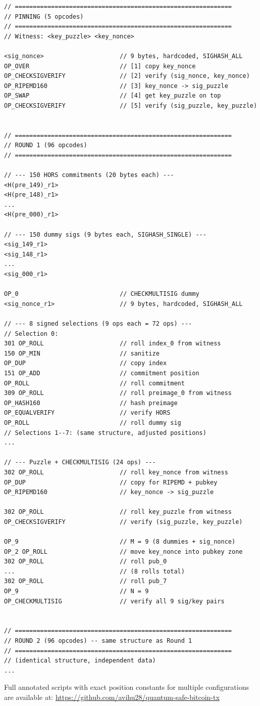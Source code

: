 \documentclass[11pt, a4paper]{article}
\begin{document}
\begin{lstlisting}[language={}, numbers=none, basicstyle=\scriptsize\ttfamily]
// ============================================================
// PINNING (5 opcodes)
// ============================================================
// Witness: <key_puzzle> <key_nonce>

<sig_nonce>                     // 9 bytes, hardcoded, SIGHASH_ALL
OP_OVER                         // [1] copy key_nonce
OP_CHECKSIGVERIFY               // [2] verify (sig_nonce, key_nonce)
OP_RIPEMD160                    // [3] key_nonce -> sig_puzzle
OP_SWAP                         // [4] get key_puzzle on top
OP_CHECKSIGVERIFY               // [5] verify (sig_puzzle, key_puzzle)


// ============================================================
// ROUND 1 (96 opcodes)
// ============================================================

// --- 150 HORS commitments (20 bytes each) ---
<H(pre_149)_r1>
<H(pre_148)_r1>
...
<H(pre_000)_r1>

// --- 150 dummy sigs (9 bytes each, SIGHASH_SINGLE) ---
<sig_149_r1>
<sig_148_r1>
...
<sig_000_r1>

OP_0                            // CHECKMULTISIG dummy
<sig_nonce_r1>                  // 9 bytes, hardcoded, SIGHASH_ALL

// --- 8 signed selections (9 ops each = 72 ops) ---
// Selection 0:
301 OP_ROLL                     // roll index_0 from witness
150 OP_MIN                      // sanitize
OP_DUP                          // copy index
151 OP_ADD                      // commitment position
OP_ROLL                         // roll commitment
309 OP_ROLL                     // roll preimage_0 from witness
OP_HASH160                      // hash preimage
OP_EQUALVERIFY                  // verify HORS
OP_ROLL                         // roll dummy sig
// Selections 1--7: (same structure, adjusted positions)
...

// --- Puzzle + CHECKMULTISIG (24 ops) ---
302 OP_ROLL                     // roll key_nonce from witness
OP_DUP                          // copy for RIPEMD + pubkey
OP_RIPEMD160                    // key_nonce -> sig_puzzle

302 OP_ROLL                     // roll key_puzzle from witness
OP_CHECKSIGVERIFY               // verify (sig_puzzle, key_puzzle)

OP_9                            // M = 9 (8 dummies + sig_nonce)
OP_2 OP_ROLL                    // move key_nonce into pubkey zone
302 OP_ROLL                     // roll pub_0
...                             // (8 rolls total)
302 OP_ROLL                     // roll pub_7
OP_9                            // N = 9
OP_CHECKMULTISIG                // verify all 9 sig/key pairs


// ============================================================
// ROUND 2 (96 opcodes) -- same structure as Round 1
// ============================================================
// (identical structure, independent data)
...
\end{lstlisting}

\noindent Full annotated scripts with exact position constants for multiple configurations are available at: \url{https://github.com/avihu28/quantum-safe-bitcoin-tx}
\end{document}
